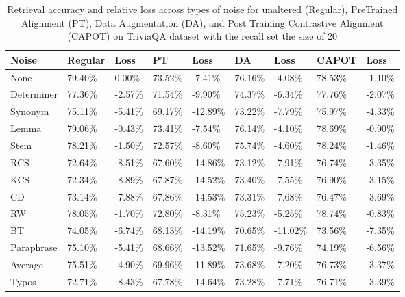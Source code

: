 \begin{table*}[!ht]
    \centering
    \begin{tabular}{|l|l|l|l|l|l|l|l|l|}
    \hline
        Noise & Regular & Loss & PT & Loss & DA & Loss & CAPOT & Loss \\ \hline
        None & 79.40\% & 0.00\% & 73.52\% & -7.41\% & 76.16\% & -4.08\% & 78.53\% & -1.10\% \\ \hline
        Determiner & 77.36\% & -2.57\% & 71.54\% & -9.90\% & 74.37\% & -6.34\% & 77.76\% & -2.07\% \\ \hline
        Synonym & 75.11\% & -5.41\% & 69.17\% & -12.89\% & 73.22\% & -7.79\% & 75.97\% & -4.33\% \\ \hline
        Lemma & 79.06\% & -0.43\% & 73.41\% & -7.54\% & 76.14\% & -4.10\% & 78.69\% & -0.90\% \\ \hline
        Stem & 78.21\% & -1.50\% & 72.57\% & -8.60\% & 75.74\% & -4.60\% & 78.24\% & -1.46\% \\ \hline
        RCS & 72.64\% & -8.51\% & 67.60\% & -14.86\% & 73.12\% & -7.91\% & 76.74\% & -3.35\% \\ \hline
        KCS & 72.34\% & -8.89\% & 67.87\% & -14.52\% & 73.40\% & -7.55\% & 76.90\% & -3.15\% \\ \hline
        CD & 73.14\% & -7.88\% & 67.86\% & -14.53\% & 73.31\% & -7.68\% & 76.47\% & -3.69\% \\ \hline
        RW & 78.05\% & -1.70\% & 72.80\% & -8.31\% & 75.23\% & -5.25\% & 78.74\% & -0.83\% \\ \hline
        BT & 74.05\% & -6.74\% & 68.13\% & -14.19\% & 70.65\% & -11.02\% & 73.56\% & -7.35\% \\ \hline
        Paraphrase & 75.10\% & -5.41\% & 68.66\% & -13.52\% & 71.65\% & -9.76\% & 74.19\% & -6.56\% \\ \hline
        Average & 75.51\% & -4.90\% & 69.96\% & -11.89\% & 73.68\% & -7.20\% & 76.73\% & -3.37\% \\ \hline
        Typos & 72.71\% & -8.43\% & 67.78\% & -14.64\% & 73.28\% & -7.71\% & 76.71\% & -3.39\% \\ \hline
    \end{tabular}
    \caption{Retrieval accuracy and relative loss across types of noise for unaltered (Regular), PreTrained Alignment (PT),  Data Augmentation (DA), and Post Training Contrastive Alignment (CAPOT) on TriviaQA dataset with the recall set the size of 20}
    \label{tab:capot-trivia-20}
\end{table*}
